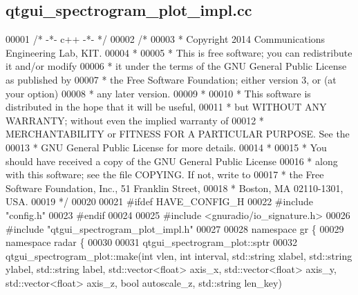 \subsection{qtgui\+\_\+spectrogram\+\_\+plot\+\_\+impl.\+cc}
\label{qtgui__spectrogram__plot__impl_8cc_source}

\begin{DoxyCode}
00001 \textcolor{comment}{/* -*- c++ -*- */}
00002 \textcolor{comment}{/* }
00003 \textcolor{comment}{ * Copyright 2014 Communications Engineering Lab, KIT.}
00004 \textcolor{comment}{ * }
00005 \textcolor{comment}{ * This is free software; you can redistribute it and/or modify}
00006 \textcolor{comment}{ * it under the terms of the GNU General Public License as published by}
00007 \textcolor{comment}{ * the Free Software Foundation; either version 3, or (at your option)}
00008 \textcolor{comment}{ * any later version.}
00009 \textcolor{comment}{ * }
00010 \textcolor{comment}{ * This software is distributed in the hope that it will be useful,}
00011 \textcolor{comment}{ * but WITHOUT ANY WARRANTY; without even the implied warranty of}
00012 \textcolor{comment}{ * MERCHANTABILITY or FITNESS FOR A PARTICULAR PURPOSE.  See the}
00013 \textcolor{comment}{ * GNU General Public License for more details.}
00014 \textcolor{comment}{ * }
00015 \textcolor{comment}{ * You should have received a copy of the GNU General Public License}
00016 \textcolor{comment}{ * along with this software; see the file COPYING.  If not, write to}
00017 \textcolor{comment}{ * the Free Software Foundation, Inc., 51 Franklin Street,}
00018 \textcolor{comment}{ * Boston, MA 02110-1301, USA.}
00019 \textcolor{comment}{ */}
00020 
00021 \textcolor{preprocessor}{#ifdef HAVE\_CONFIG\_H}
00022 \textcolor{preprocessor}{#include "config.h"}
00023 \textcolor{preprocessor}{#endif}
00024 
00025 \textcolor{preprocessor}{#include <gnuradio/io\_signature.h>}
00026 \textcolor{preprocessor}{#include "qtgui_spectrogram_plot_impl.h"}
00027 
00028 \textcolor{keyword}{namespace }gr \{
00029   \textcolor{keyword}{namespace }radar \{
00030 
00031     qtgui_spectrogram_plot::sptr
00032     qtgui_spectrogram_plot::make(\textcolor{keywordtype}{int} vlen, \textcolor{keywordtype}{int} interval, std::string xlabel, 
      std::string ylabel, std::string label, std::vector<float> axis\_x, std::vector<float> axis\_y, 
      std::vector<float> axis\_z, \textcolor{keywordtype}{bool} autoscale\_z, std::string len\_key)

\end{DoxyCode}
